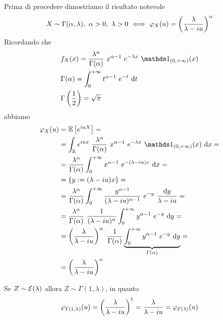 \Soluzione{} %
Prima di procedere dimostriamo il risultato notevole
\[
X\sim\Gamma(\alpha,\lambda),\ \alpha>0,\ \lambda>0\SESOLOSE\varphi_X(u)=\left( \frac{\lambda}{\lambda-iu} \right)^\alpha
\]
Ricordando che
\begin{gather*}
\begin{aligned}
&f_X(x)=\frac{\lambda^\alpha}{\Gamma(\alpha)}\ x^{\alpha-1}\ e^{-\lambda x}\ \Ind_{(0,+\infty)}(x) \\
&\Gamma(\alpha)=\intc t^{\alpha-1}\ e^{-t}\dt \\
&\Gamma\left(\frac{1}{2}\right)=\sqrt{\pi}
\end{aligned}
\end{gather*}
abbiamo
\begin{gather*}
\begin{aligned}
\varphi_X(u)&=\EE\left[e^{iuX}  \right]=\\
&=\int_\RR e^{iux}\ \frac{\lambda^\alpha}{\Gamma(\alpha)}\ x^{\alpha-1}\ e^{-\lambda x}\ \Ind_{(0,+\infty)}(x)\dx=\\
&=\frac{\lambda^\alpha}{\Gamma(\alpha)}\intc x^{\alpha-1}\ e^{-(\lambda-iu) x}\dx=\\
&=\{ y:=(\lambda-iu)x \}=\\
&=\frac{\lambda^\alpha}{\Gamma(\alpha)}\intc \frac{y^{\alpha-1}}{(\lambda-iu)^{\alpha-1}}\ e^{-y}\ \frac{\text{d}y}{\lambda-iu}=\\
&=\frac{\lambda^\alpha}{\Gamma(\alpha)}\ \frac{1}{(\lambda-iu)^{\alpha}}\intc y^{\alpha-1}\ e^{-y}\dy =\\
&=\left(\frac{\lambda}{\lambda-iu}\right)^\alpha\ \frac{1}{\Gamma(\alpha)}\underbrace{\intc y^{\alpha-1}\ e^{-y}\dy}_{\Gamma(\alpha)}=\\
&=\left(\frac{\lambda}{\lambda-iu}\right)^\alpha
\end{aligned}
\end{gather*}
\begin{oss}
Se $Z\sim\mathcal{E}(\lambda)$ allora $Z\sim\Gamma(1,\lambda)$, in quanto
\[
\varphi_{\Gamma(1,\lambda)}(u)=\left(\frac{\lambda}{\lambda-iu}\right)^1=\frac{\lambda}{\lambda-iu}=\varphi_{\mathcal{E}(\lambda)}(u)
\]
\end{oss}
